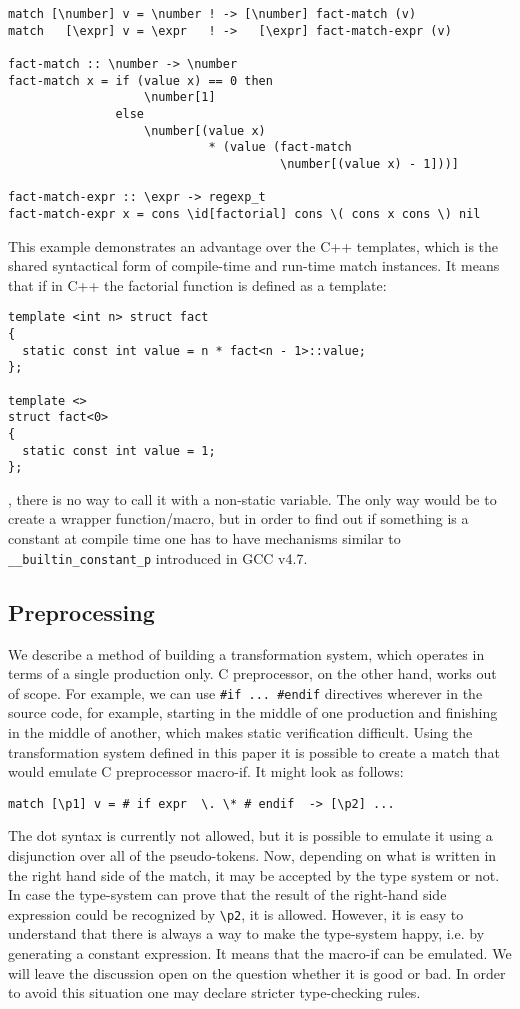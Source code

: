 \begin{verbatim}
match [\number] v = \number ! -> [\number] fact-match (v)
match   [\expr] v = \expr   ! ->   [\expr] fact-match-expr (v)

fact-match :: \number -> \number
fact-match x = if (value x) == 0 then
                   \number[1]
               else
                   \number[(value x) 
                            * (value (fact-match 
                                      \number[(value x) - 1]))]

fact-match-expr :: \expr -> regexp_t
fact-match-expr x = cons \id[factorial] cons \( cons x cons \) nil
\end{verbatim}

This example demonstrates an advantage over the C++ templates, which
is the shared syntactical form of compile-time and run-time match instances.
It means that if in C++ the factorial function is defined as a template:
\begin{verbatim}
template <int n> struct fact 
{
  static const int value = n * fact<n - 1>::value;
};
 
template <>
struct fact<0> 
{
  static const int value = 1;
};
\end{verbatim}
, there is no way to call it with a non-static variable.  The only way 
would be to create a wrapper function/macro, but in order to find out
if something is a constant at compile time one has to have mechanisms
similar to \verb|__builtin_constant_p| introduced in GCC v4.7.

\subsection{Preprocessing}
We describe a method of building a transformation system, which operates 
in terms of a
single production only.  C preprocessor, on the other hand, works out of scope.
For example, we can use \verb|#if ... #endif| directives wherever in the
source code, for example, starting in the middle of one production and
finishing in the middle of another, which makes static verification difficult.
Using the transformation system defined in this paper it is possible to 
create a match
that would emulate C preprocessor macro-if.  It might look as follows:
\begin{verbatim}
match [\p1] v = # if expr  \. \* # endif  -> [\p2] ...
\end{verbatim}
The dot syntax is currently not allowed, but it is possible to emulate it using
a disjunction over all of the pseudo-tokens.  Now, depending on what is written
in the right hand side of the match, it may be accepted by the type system or
not.  In case the type-system can prove that the result of the right-hand side
expression could be recognized by \verb|\p2|, it is allowed.  However, it is
easy to understand that there is always a way to make the type-system happy,
i.e. by generating a constant expression.  It means that the macro-if can be
emulated.  We will leave the discussion open on the question whether it is good
or bad.  In order to avoid this situation one may declare stricter
type-checking rules.

